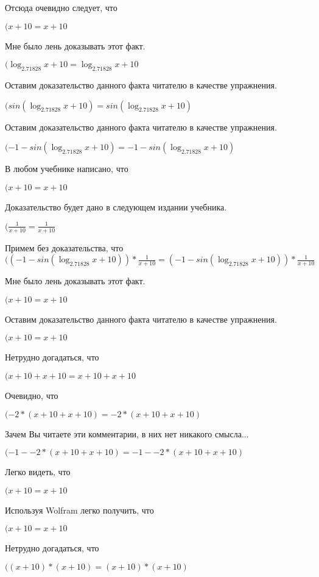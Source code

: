 \documentclass[12pt,a4paper,fleqn]{article}
\theoremstyle{definition}
\begin{document}
Отсюда очевидно следует, что

$( x  +  10  =  x  +  10 $

Мне было лень доказывать этот факт.

$(\log_{ 2.71828 }{ x  +  10 } = \log_{ 2.71828 }{ x  +  10 }$

Оставим доказательство данного факта читателю в качестве упражнения.

$(sin(\log_{ 2.71828 }{ x  +  10 }) = sin(\log_{ 2.71828 }{ x  +  10 })$

Оставим доказательство данного факта читателю в качестве упражнения.

$( -1  - sin(\log_{ 2.71828 }{ x  +  10 }) =  -1  - sin(\log_{ 2.71828 }{ x  +  10 })$

В любом учебнике написано, что

$( x  +  10  =  x  +  10 $

Доказательство будет дано в следующем издании учебника.

$(\frac{ 1 }{ x  +  10 }
 = \frac{ 1 }{ x  +  10 }
$

Примем без доказательства, что
$(( -1  - sin(\log_{ 2.71828 }{ x  +  10 })) * \frac{ 1 }{ x  +  10 }
 = ( -1  - sin(\log_{ 2.71828 }{ x  +  10 })) * \frac{ 1 }{ x  +  10 }
$

Мне было лень доказывать этот факт.

$( x  +  10  =  x  +  10 $

Оставим доказательство данного факта читателю в качестве упражнения.

$( x  +  10  =  x  +  10 $

Нетрудно догадаться, что

$( x  +  10  +  x  +  10  =  x  +  10  +  x  +  10 $

Очевидно, что

$( -2  * ( x  +  10  +  x  +  10 ) =  -2  * ( x  +  10  +  x  +  10 )$

Зачем Вы читаете эти комментарии, в них нет никакого смысла...

$( -1  -  -2  * ( x  +  10  +  x  +  10 ) =  -1  -  -2  * ( x  +  10  +  x  +  10 )$

Легко видеть, что

$( x  +  10  =  x  +  10 $

Используя Wolfram легко получить, что

$( x  +  10  =  x  +  10 $

Нетрудно догадаться, что

$(( x  +  10 ) * ( x  +  10 ) = ( x  +  10 ) * ( x  +  10 )$
\end{document}
